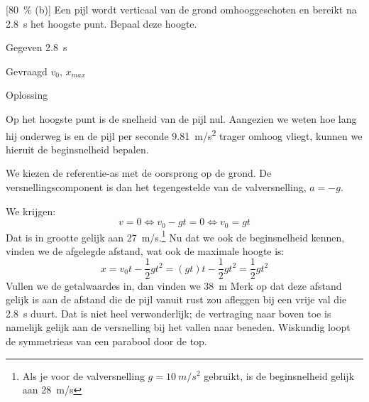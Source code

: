 
\begin{exercise}

[\SI{80}{\percent} (b)] Een pijl wordt verticaal van de grond omhooggeschoten en bereikt na \SI{2,8}{s} het hoogste punt. Bepaal deze hoogte.
\begin{oplossing}
\item[Gegeven]\SI{2,8}{s}
\item[Gevraagd]$v_0$, $x_{max}$

\item[Oplossing]\begin{minipage}[t]{0.6\linewidth}
	Op het hoogste punt is de snelheid van de pijl nul. Aangezien we weten hoe lang hij onderweg is en de pijl per seconde \SI{9,81}{m/s^2} trager omhoog vliegt, kunnen we hieruit de beginsnelheid bepalen. 
	
	We kiezen de referentie-as met de oorsprong op de grond. De versnellingscomponent is dan het tegengestelde van de valversnelling, $a=-g$.
\end{minipage}%
\begin{minipage}[t]{0.37\linewidth}
	\raisebox{1ex-\height}{%
	\texttt{[image: 55p44]}%
	}
\end{minipage}

We krijgen:
\begin{equation*}
v=0\Leftrightarrow v_0-gt=0\Leftrightarrow v_0=gt
\end{equation*}
Dat is in grootte gelijk aan \SI{27}{m/s}.\footnote{Als je voor de valversnelling $g=\SI{10}{m/s^2}$ gebruikt, is de beginsnelheid gelijk aan \SI{28}{m/s}} Nu dat we ook de beginsnelheid kennen, vinden we de afgelegde afstand, wat ook de maximale hoogte is:
\begin{equation*}
x=v_0t-\frac{1}{2}gt^2=(gt)t-\frac{1}{2}gt^2=\frac{1}{2}gt^2
\end{equation*}
Vullen we de getalwaardes in, dan vinden we \SI{38}{m}
\newline
\newline
Merk op dat deze afstand gelijk is aan de afstand die de pijl vanuit rust zou afleggen bij een vrije val die \SI{2,8}{s} duurt. Dat is niet heel verwonderlijk; de vertraging naar boven toe is namelijk gelijk aan de versnelling bij het vallen naar beneden. Wiskundig loopt de symmetrieas van een parabool door de top. 

\end{oplossing}

\end{exercise}
